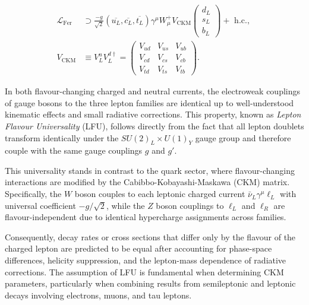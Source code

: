 \begin{equation}
	\begin{aligned}
		\mathcal{L}_{\mathrm{Fer}} &\supset
		\frac{-g}{\sqrt{2}}
		\left(\overline{u_{L}}, \overline{c_{L}}, \overline{t_{L}}\right) 
		\gamma^{\mu} W_{\mu}^{+} V_{\mathrm{CKM}}\left(
			\begin{array}{l}
				d_{L} \\
				s_{L} \\
				b_{L}
			\end{array}
		\right)+\text { h.c., } 
		\\V_{\mathrm{CKM}} &\equiv V_{L}^{u} V_{L}^{d \dagger}
		=\left(\begin{array}{ccc}
			V_{u d} & V_{u s} & V_{u b} \\
			V_{c d} & V_{c s} & V_{c b} \\
			V_{t d} & V_{t s} & V_{t b}
		\end{array}\right) .
	\end{aligned}
\end{equation}


In both flavour-changing charged and neutral currents, the electroweak couplings of gauge bosons to the three lepton families are identical up to well-understood kinematic effects and small radiative corrections. This property, known as \textit{Lepton Flavour Universality} (LFU), follows directly from the fact that all lepton doublets transform identically under the $SU(2)_L\times U(1)_Y$ gauge group and therefore couple with the same gauge couplings $g$ and $g'$. 

This universality stands in contrast to the quark sector, where flavour-changing interactions are modified by the Cabibbo-Kobayashi-Maskawa (CKM) matrix. Specifically, the $W$ boson couples to each leptonic charged current $\bar{\nu}_{L}\gamma^\mu \ell_{L}$ with universal coefficient $-g/\sqrt{2}$, while the $Z$ boson couplings to $\ell_{L}$ and $\ell_{R}$ are flavour-independent due to identical hypercharge assignments across families. 

Consequently, decay rates or cross sections that differ only by the flavour of the charged lepton are predicted to be equal after accounting for phase-space differences, helicity suppression, and the lepton-mass dependence of radiative corrections. The assumption of LFU is fundamental when determining CKM parameters, particularly when combining results from semileptonic and leptonic decays involving electrons, muons, and tau leptons.

